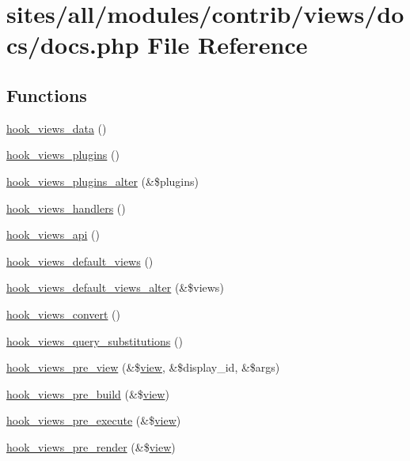 \hypertarget{docs_8php}{
\section{sites/all/modules/contrib/views/docs/docs.php File Reference}
\label{docs_8php}
}
\subsection*{Functions}
\begin{CompactItemize}
\item 
\hyperlink{group__views__hooks_g227057901681e4a33e33c199c7a8c989}{hook\_\-views\_\-data} ()
\item 
\hyperlink{group__views__hooks_g23f6e9972b2ed84fc54b7ff63f44477d}{hook\_\-views\_\-plugins} ()
\item 
\hyperlink{group__views__hooks_g6c4e4c2a769b0017bf0edcd0adae57e9}{hook\_\-views\_\-plugins\_\-alter} (\&\$plugins)
\item 
\hyperlink{group__views__hooks_gbf506f44bd8d8a86876f27396f5341ed}{hook\_\-views\_\-handlers} ()
\item 
\hyperlink{group__views__hooks_gc67ffd4a2f61f9814ee37b541c472c47}{hook\_\-views\_\-api} ()
\item 
\hyperlink{group__views__hooks_g23edb74860682fa88f75cf94b97c2e15}{hook\_\-views\_\-default\_\-views} ()
\item 
\hyperlink{group__views__hooks_gcd31035a6ae9c7baf05ad034d6a65768}{hook\_\-views\_\-default\_\-views\_\-alter} (\&\$views)
\item 
\hyperlink{group__views__hooks_ge98b0a1c700fe1406af390dfc8c7262e}{hook\_\-views\_\-convert} ()
\item 
\hyperlink{group__views__hooks_g2a2f60cadfec300b51a4960080ef8ac5}{hook\_\-views\_\-query\_\-substitutions} ()
\item 
\hyperlink{group__views__hooks_g471b90caa886a4e4239a839d6bf7a963}{hook\_\-views\_\-pre\_\-view} (\&\$\hyperlink{classview}{view}, \&\$display\_\-id, \&\$args)
\item 
\hyperlink{group__views__hooks_g1c3fc52e2854310f84eeb43b98a0ba64}{hook\_\-views\_\-pre\_\-build} (\&\$\hyperlink{classview}{view})
\item 
\hyperlink{group__views__hooks_gf7582b210bdd367d6006c7dc62304475}{hook\_\-views\_\-pre\_\-execute} (\&\$\hyperlink{classview}{view})
\item 
\hyperlink{group__views__hooks_gb88d5c49ec4ad30dba2be34327d5b0cc}{hook\_\-views\_\-pre\_\-render} (\&\$\hyperlink{classview}{view})

\end{CompactItemize}
